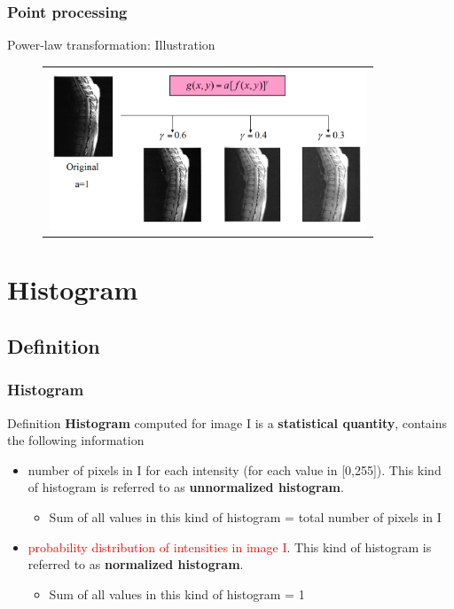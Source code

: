 \documentclass[english,11pt,table,handout]{beamer}
\begin{document}
\begin{frame}[fragile]
\frametitle{Point processing}
\begin{block}{Power-law transformation: Illustration}
	\begin{figure}[!h]
		\begin{table}
			\begin{tabular}{c}
				\includegraphics[width=9.5cm]{./images/power_law_trans.png} 
			\end{tabular}
		\end{table}
	\end{figure}
\end{block}
\end{frame}


\section{Histogram}
\subsection{Definition}
\begin{frame}[fragile]
\frametitle{Histogram}
\begin{block}{Definition}
	\textbf{Histogram} computed for image I is a \textbf{statistical quantity}, contains the following information
	\begin{itemize}
		\item number of pixels in I for each intensity (for each value in [0,255]). This kind of histogram is referred to as \textbf{unnormalized histogram}.
		\begin{itemize}
			\item Sum of all values in this kind of histogram  = total number of pixels in I
		\end{itemize}
		\item \textcolor{red}{probability distribution of intensities in image I}. This kind of histogram is referred to as \textbf{normalized histogram}.
		\begin{itemize}
			\item Sum of all values in this kind of histogram  = 1
		\end{itemize}
		
	\end{itemize}
\end{block}
\end{frame}
\end{document}
